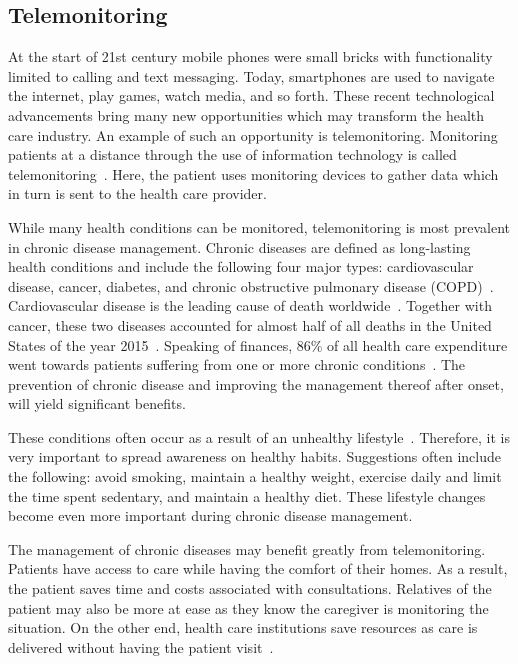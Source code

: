     \subsection{Telemonitoring}\label{telemonitoring}

    At the start of 21st century mobile phones were small bricks with functionality limited to calling and text messaging. Today, smartphones are used to navigate the internet, play games, watch media, and so forth. These recent technological advancements bring many new opportunities which may transform the health care industry. An example of such an opportunity is telemonitoring. Monitoring patients at a distance through the use of information technology is called telemonitoring~\cite{Field1996}. Here, the patient uses monitoring devices to gather data which in turn is sent to the health care provider. 
    
    While many health conditions can be monitored, telemonitoring is most prevalent in chronic disease management. Chronic diseases are defined as long-lasting health conditions and include the following four major types: cardiovascular disease, cancer, diabetes, and chronic obstructive pulmonary disease (COPD)~\cite{WHO2014}. Cardiovascular disease is the leading cause of death worldwide~\cite{Mendis2011}. Together with cancer, these two diseases accounted for almost half of all deaths in the United States of the year 2015~\cite{NCHS2015}. Speaking of finances, 86\% of all health care expenditure went towards patients suffering from one or more chronic conditions~\cite{Gerteis2014}. The prevention of chronic disease and improving the management thereof after onset, will yield significant benefits.
    
    These conditions often occur as a result of an unhealthy lifestyle~\cite{Willett2006}. Therefore, it is very important to spread awareness on healthy habits. Suggestions often include the following: avoid smoking, maintain a healthy weight, exercise daily and limit the time spent sedentary, and maintain a healthy diet. These lifestyle changes become even more important during chronic disease management.

    The management of chronic diseases may benefit greatly from telemonitoring. Patients have access to care while having the comfort of their homes. As a result, the patient saves time and costs associated with consultations. Relatives of the patient may also be more at ease as they know the caregiver is monitoring the situation. On the other end, health care institutions save resources as care is delivered without having the patient visit~\cite{Meystre2005}.

